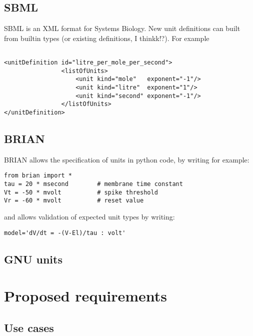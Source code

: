 \documentclass{article}
\begin{document}
\subsection*{SBML}
SBML is an XML format for Systems Biology. New unit definitions can built from builtin types (or existing definitions, I thinkk!?).
For example

\begin{lstlisting}

<unitDefinition id="litre_per_mole_per_second">
                <listOfUnits>
                    <unit kind="mole"   exponent="-1"/>
                    <unit kind="litre"  exponent="1"/>
                    <unit kind="second" exponent="-1"/>
                </listOfUnits>
</unitDefinition>
\end{lstlisting}



\subsection*{BRIAN}
BRIAN allows the specification of units in python code, by writing for example:

\begin{lstlisting}
from brian import *
tau = 20 * msecond        # membrane time constant
Vt = -50 * mvolt          # spike threshold
Vr = -60 * mvolt          # reset value
\end{lstlisting}

and allows validation of expected unit types by writing:
\begin{lstlisting}
model='dV/dt = -(V-El)/tau : volt'
\end{lstlisting}


\subsection*{GNU units}




\newpage
\section{Proposed requirements} 
\subsection{Use cases}
\end{document}
